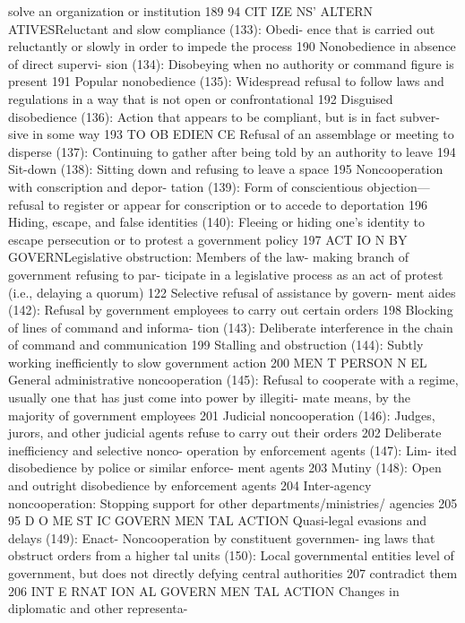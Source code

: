 \documentclass[twoside,a4paper,12pt,fleqn,openany]{extbook}
\begin{document}
solve an organization or institution
 189
94
CIT IZE NS’ ALTERN ATIVESReluctant and slow compliance (133): Obedi-
ence that is carried out reluctantly or slowly in
order to impede the process
 190
Nonobedience in absence of direct supervi-
sion (134): Disobeying when no authority or
command figure is present
 191
Popular nonobedience (135): Widespread
refusal to follow laws and regulations in a way
that is not open or confrontational
 192
Disguised disobedience (136): Action that
appears to be compliant, but is in fact subver-
sive in some way
 193
TO OB EDIEN CE
Refusal of an assemblage or meeting to
disperse (137): Continuing to gather after being
told by an authority to leave
 194
Sit-down (138): Sitting down and refusing to
leave a space
 195
Noncooperation with conscription and depor-
tation (139): Form of conscientious objection—
refusal to register or appear for conscription or
to accede to deportation
 196
Hiding, escape, and false identities (140):
Fleeing or hiding one’s identity to escape
persecution or to protest a government
policy
 197
ACT IO N BY GOVERNLegislative obstruction: Members of the law-
making branch of government refusing to par-
ticipate in a legislative process as an act of
protest (i.e., delaying a quorum)
 122
Selective refusal of assistance by govern-
ment aides (142): Refusal by government
employees to carry out certain orders
 198
Blocking of lines of command and informa-
tion (143): Deliberate interference in the chain
of command and communication
 199
Stalling and obstruction (144): Subtly working
inefficiently to slow government action 200
MEN T PERSON N EL
General administrative noncooperation (145):
Refusal to cooperate with a regime, usually
one that has just come into power by illegiti-
mate means, by the majority of government
employees
 201
Judicial noncooperation (146): Judges, jurors,
and other judicial agents refuse to carry out
their orders
 202
Deliberate inefficiency and selective nonco-
operation by enforcement agents (147): Lim-
ited disobedience by police or similar enforce-
ment agents
 203
Mutiny (148): Open and outright disobedience
by enforcement agents
 204
Inter-agency noncooperation: Stopping
support for other departments/ministries/
agencies
 205
95
D O ME ST IC GOVERN MEN TAL ACTION
Quasi-legal evasions and delays (149): Enact-
 Noncooperation by constituent governmen-
ing laws that obstruct orders from a higher
 tal units (150): Local governmental entities
level of government, but does not directly
 defying central authorities
 207
contradict them
 206
INT E RNAT ION AL GOVERN MEN TAL ACTION
Changes in diplomatic and other representa-
\end{document}
